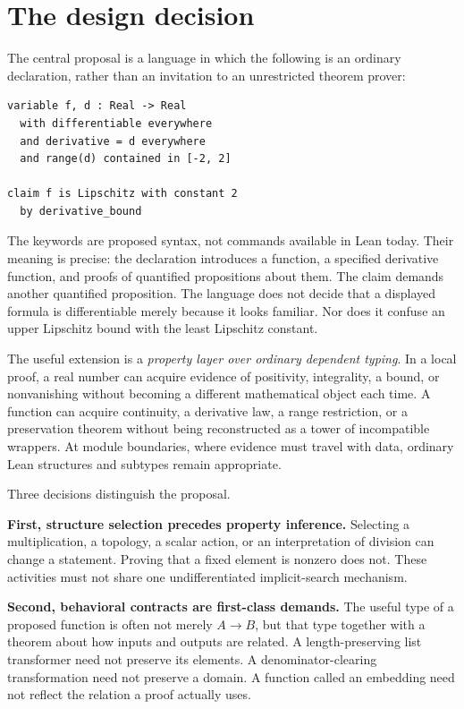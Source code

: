 \documentclass[11pt,a4paper]{article}
\theoremstyle{definition}
\theoremstyle{remark}
\begin{document}
\begingroup
\small
\setlength{\parskip}{0pt}
\tableofcontents
\endgroup
\clearpage

\section{The design decision}
\label{sec:decision}

The central proposal is a language in which the following is an ordinary declaration, rather than an invitation to an unrestricted theorem prover:
\begin{lstlisting}
variable f, d : Real -> Real
  with differentiable everywhere
  and derivative = d everywhere
  and range(d) contained in [-2, 2]

claim f is Lipschitz with constant 2
  by derivative_bound
\end{lstlisting}
The keywords are proposed syntax, not commands available in Lean today. Their meaning is precise: the declaration introduces a function, a specified derivative function, and proofs of quantified propositions about them. The claim demands another quantified proposition. The language does not decide that a displayed formula is differentiable merely because it looks familiar. Nor does it confuse an upper Lipschitz bound with the least Lipschitz constant.

The useful extension is a \emph{property layer over ordinary dependent typing}. In a local proof, a real number can acquire evidence of positivity, integrality, a bound, or nonvanishing without becoming a different mathematical object each time. A function can acquire continuity, a derivative law, a range restriction, or a preservation theorem without being reconstructed as a tower of incompatible wrappers. At module boundaries, where evidence must travel with data, ordinary Lean structures and subtypes remain appropriate.

Three decisions distinguish the proposal.

\textbf{First, structure selection precedes property inference.} Selecting a multiplication, a topology, a scalar action, or an interpretation of division can change a statement. Proving that a fixed element is nonzero does not. These activities must not share one undifferentiated implicit-search mechanism.

\textbf{Second, behavioral contracts are first-class demands.} The useful type of a proposed function is often not merely $A\to B$, but that type together with a theorem about how inputs and outputs are related. A length-preserving list transformer need not preserve its elements. A denominator-clearing transformation need not preserve a domain. A function called an embedding need not reflect the relation a proof actually uses.
\end{document}
